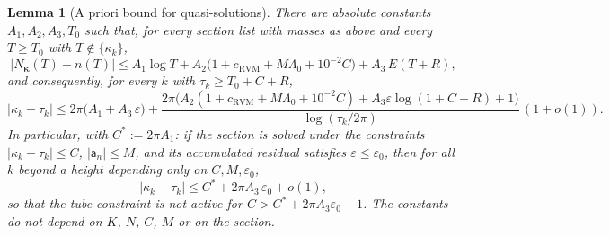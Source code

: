 \documentclass[11pt]{article}
\newtheorem{lemma}{Lemma}
\newcommand{\RVM}{\mathrm{RVM}}
\begin{document}
\begin{lemma}[A priori bound for quasi-solutions]\label{lem:apriori}
There are absolute constants $A_1,A_2,A_3,T_0$ such that, for every section list with masses as above and every $T\ge T_0$ with $T\notin\{\kappa_k\}$,
\begin{equation}\label{eq:count-bound}
 \bigl|N_{\boldsymbol\kappa}(T)-n(T)\bigr|\le A_1\log T+A_2\bigl(1+c_{\RVM}+M\Lambda_0+10^{-2}C\bigr)+A_3\,E(T+R),
\end{equation}
and consequently, for every $k$ with $\tau_k\ge T_0+C+R$,
\begin{equation}\label{eq:disp-bound}
 |\kappa_k-\tau_k|\le 2\pi\bigl(A_1+A_3\,\varepsilon\bigr)+\frac{2\pi\bigl(A_2(1+c_{\RVM}+M\Lambda_0+10^{-2}C)+A_3\varepsilon\log(1+C+R)+1\bigr)}{\log(\tau_k/2\pi)}\,(1+o(1)).
\end{equation}
In particular, with $C^*:=2\pi A_1$: if the section is solved under the constraints $|\kappa_k-\tau_k|\le C$, $|\mathsf a_n|\le M$, and its accumulated residual satisfies $\varepsilon\le\varepsilon_0$, then for all $k$ beyond a height depending only on $C,M,\varepsilon_0$,
\[
 |\kappa_k-\tau_k|\le C^*+2\pi A_3\,\varepsilon_0+o(1),
\]
so that the tube constraint is not active for $C>C^*+2\pi A_3\varepsilon_0+1$. The constants do not depend on $K$, $N$, $C$, $M$ or on the section.
\end{lemma}
\end{document}
